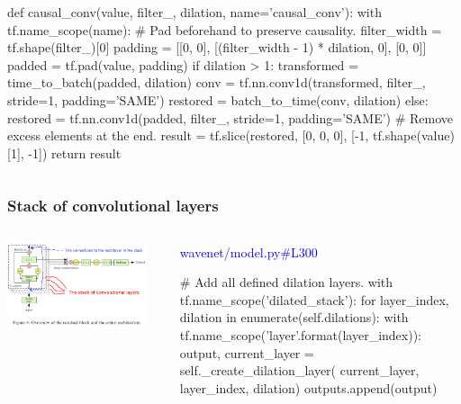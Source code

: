 \documentclass[8pt]{beamer}
\begin{document}
\begin{frame}[fragile]
\begin{columns}
\begin{column}{0.5\textwidth}
\begin{verbnobox}[\tiny]
def causal_conv(value, filter_, dilation, name='causal_conv'):
    with tf.name_scope(name):
        # Pad beforehand to preserve causality.
        filter_width = tf.shape(filter_)[0]
        padding = [[0, 0], [(filter_width - 1) * dilation, 0], [0, 0]]
        padded = tf.pad(value, padding)
        if dilation > 1:
            transformed = time_to_batch(padded, dilation)
            conv = tf.nn.conv1d(transformed, filter_, stride=1, padding='SAME')
            restored = batch_to_time(conv, dilation)
        else:
            restored = tf.nn.conv1d(padded, filter_, stride=1, padding='SAME')
        # Remove excess elements at the end.
        result = tf.slice(restored,
                          [0, 0, 0],
                          [-1, tf.shape(value)[1], -1])
    return result
 \end{verbnobox}
\end{column}
\end{columns} 
 
\end{frame}

\begin{frame}[fragile]
\frametitle{Stack of convolutional layers}
\begin{columns}
\begin{column}{0.5\textwidth}
 
\includegraphics[width=0.9\textwidth]{./dl3_images/stack_of_convolutional_layers.png}

\end{column}
\begin{column}{0.5\textwidth}
 
 \textcolor{blue}{wavenet/model.py\#L300}
 
 \begin{verbnobox}[\tiny]
  # Add all defined dilation layers.
  with tf.name_scope('dilated_stack'):
      for layer_index, dilation in enumerate(self.dilations):
          with tf.name_scope('layer{}'.format(layer_index)):
              output, current_layer = self._create_dilation_layer(
                  current_layer, layer_index, dilation)
              outputs.append(output)
 \end{verbnobox}
\end{column}
\end{columns} 
 
\end{frame}
\end{document}
